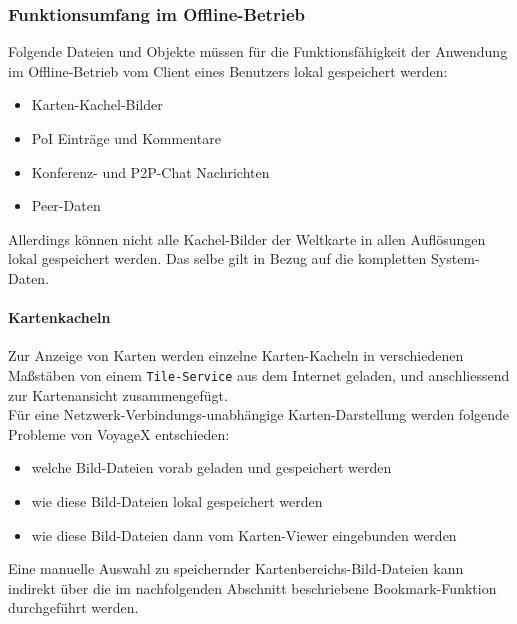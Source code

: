 \subsubsection{Funktionsumfang im Offline-Betrieb}
Folgende Dateien und Objekte müssen für die Funktionsfähigkeit der Anwendung im Offline-Betrieb vom Client eines Benutzers lokal gespeichert werden:
\begin{itemize}
  \item Karten-Kachel-Bilder
  \item PoI Einträge und Kommentare
  \item Konferenz- und P2P-Chat Nachrichten
  \item Peer-Daten
\end{itemize}
Allerdings können nicht alle Kachel-Bilder der Weltkarte in allen Auflösungen lokal gespeichert werden.
Das selbe gilt in Bezug auf die kompletten System-Daten. 

\paragraph{Kartenkacheln}
Zur Anzeige von Karten werden einzelne Karten-Kacheln in verschiedenen Maßstäben von einem \texttt{Tile-Service} aus dem Internet geladen, und anschliessend zur Kartenansicht zusammengefügt.\\
Für eine Netzwerk-Verbindungs-unabhängige Karten-Darstellung werden folgende Probleme von VoyageX entschieden: 
	\begin{itemize}
		\item welche Bild-Dateien vorab geladen und gespeichert werden%
		\item wie diese Bild-Dateien lokal gespeichert werden%
		\item wie diese Bild-Dateien dann vom Karten-Viewer eingebunden werden%
	\end{itemize}
Eine manuelle Auswahl zu speichernder Kartenbereichs-Bild-Dateien kann indirekt über die im nachfolgenden Abschnitt beschriebene Bookmark-Funktion durchgeführt werden.

